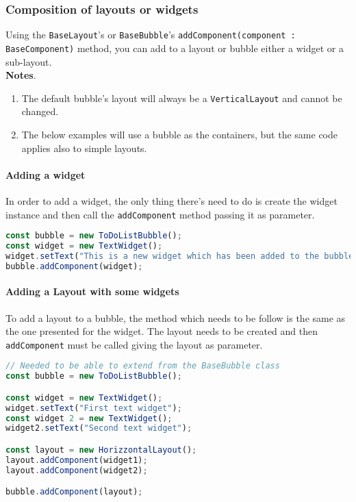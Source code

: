\subsubsection{Composition of layouts or widgets}
Using the \texttt{BaseLayout}'s or \texttt{BaseBubble}'s \texttt{addComponent(component : BaseComponent)}  method, you can add to a layout or bubble either a widget or a sub-layout. \\

\textbf{Notes}. 
\begin{enumerate}
	\item The default bubble's layout will always be a \texttt{VerticalLayout} and cannot be changed.
	\item The below examples will use a bubble as the containers, but the same code applies also to simple layouts.
\end{enumerate}

\paragraph{Adding a widget}
In order to add a widget, the only thing there's need to do is create the widget instance and then call the \texttt{addComponent} method passing it as parameter.

\begin{lstlisting}[language=JavaScript, frame=single]
const bubble = new ToDoListBubble();
const widget = new TextWidget();
widget.setText("This is a new widget which has been added to the bubble");
bubble.addComponent(widget);
\end{lstlisting}

\paragraph{Adding a Layout with some widgets}
To add a layout to a bubble, the method which needs to be follow is the same as the one presented for the widget. The layout needs to be created and then \texttt{addComponent} must be called giving the layout as parameter.

\begin{lstlisting}[language=JavaScript, frame=single]
// Needed to be able to extend from the BaseBubble class
const bubble = new ToDoListBubble();

const widget = new TextWidget();
widget.setText("First text widget");
const widget 2 = new TextWidget();
widget2.setText("Second text widget");

const layout = new HorizzontalLayout();
layout.addComponent(widget1);
layout.addComponent(widget2);

bubble.addComponent(layout);
\end{lstlisting}
